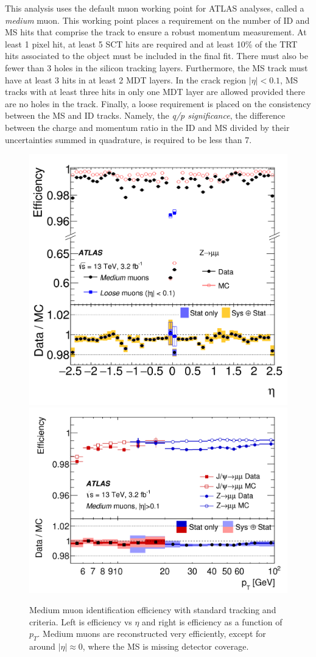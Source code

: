 This analysis uses the default muon working point for ATLAS analyses, called a \emph{medium} muon. This working point places a requirement on the number of \ac{ID} and \ac{MS} hits that comprise the track to ensure a robust momentum measurement. At least 1 pixel hit, at least 5 \ac{SCT} hits are required and at least 10\% of the \ac{TRT} hits associated to the object must be included in the final fit. There must also be fewer than 3 holes in the silicon tracking layers. Furthermore, the \ac{MS} track must have at least 3 hits in at least 2 \ac{MDT} layers. In the crack region $|\eta| < 0.1$, \ac{MS} tracks with at least three hits in only one \ac{MDT} layer are allowed provided there are no holes in the track. Finally, a loose requirement is placed on the consistency between the \ac{MS} and \ac{ID} tracks. Namely, the \emph{q/p significance}, the difference between the charge and momentum ratio in the \ac{ID} and \ac{MS} divided by their uncertainties summed in quadrature, is required to be less than 7. 


\begin{figure}[htbp]
\centering
\includegraphics[width=.43\textwidth]{figures/EventReconstruction/muon-reco-eta.png}
\includegraphics[width=.52\textwidth]{figures/EventReconstruction/muon-reco-pt.png}
\caption{Medium muon identification efficiency with standard tracking and criteria. Left is efficiency vs $\eta$ and right is efficiency as a function of $p_{T}$. Medium muons are reconstructed very efficiently, except for around $|\eta| \approx 0$, where the \ac{MS} is missing detector coverage.}
\label{fig:std_muon_eff}
\end{figure}


